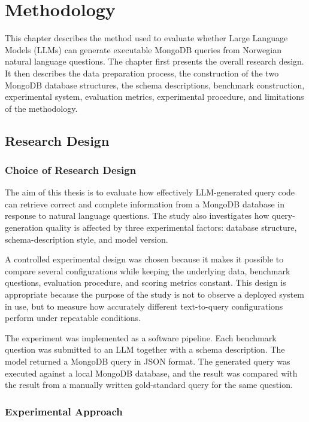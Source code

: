 \chapter{Methodology} \label{ch:methodology}

This chapter describes the method used to evaluate whether Large Language Models (LLMs) can generate executable MongoDB queries from Norwegian natural language questions. The chapter first presents the overall research design. It then describes the data preparation process, the construction of the two MongoDB database structures, the schema descriptions, benchmark construction, experimental system, evaluation metrics, experimental procedure, and limitations of the methodology.

\section{Research Design}

\subsection{Choice of Research Design}

The aim of this thesis is to evaluate how effectively LLM-generated query code can retrieve correct and complete information from a MongoDB database in response to natural language questions. The study also investigates how query-generation quality is affected by three experimental factors: database structure, schema-description style, and model version.

A controlled experimental design was chosen because it makes it possible to compare several configurations while keeping the underlying data, benchmark questions, evaluation procedure, and scoring metrics constant. This design is appropriate because the purpose of the study is not to observe a deployed system in use, but to measure how accurately different text-to-query configurations perform under repeatable conditions.

The experiment was implemented as a software pipeline. Each benchmark question was submitted to an LLM together with a schema description. The model returned a MongoDB query in JSON format. The generated query was executed against a local MongoDB database, and the result was compared with the result from a manually written gold-standard query for the same question.

\subsection{Experimental Approach}

